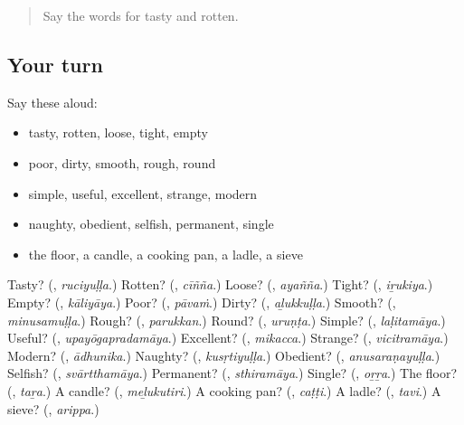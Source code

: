 \label{lesson:ML-R207-second-pass-words-from-chapters-203-207}



\begin{quote}
Say the words for tasty and rotten.
\end{quote}

\subsection*{Your turn}
Say these aloud:

\begin{itemize}
\raggedright
  \item tasty, rotten, loose, tight, empty
  \item poor, dirty, smooth, rough, round
  \item simple, useful, excellent, strange, modern
  \item naughty, obedient, selfish, permanent, single
  \item the floor, a candle, a cooking pan, a ladle, a sieve
\end{itemize}

\begin{tcolorbox}[breakable,colback=teal!4,colframe=teal!35!black,title={Before you move on}]
Tasty? (\textbf{}, \emph{ruciyuḷḷa}.) Rotten? (\textbf{}, \emph{cīñña}.) Loose? (\textbf{}, \emph{ayañña}.) Tight? (\textbf{}, \emph{iṟukiya}.) Empty? (\textbf{}, \emph{kāliyāya}.) Poor? (\textbf{}, \emph{pāvaṁ}.) Dirty? (\textbf{}, \emph{aḻukkuḷḷa}.) Smooth? (\textbf{}, \emph{minusamuḷḷa}.) Rough? (\textbf{}, \emph{parukkan}.) Round? (\textbf{}, \emph{uruṇṭa}.) Simple? (\textbf{}, \emph{laḷitamāya}.) Useful? (\textbf{}, \emph{upayōgapradamāya}.) Excellent? (\textbf{}, \emph{mikacca}.) Strange? (\textbf{}, \emph{vicitramāya}.) Modern? (\textbf{}, \emph{ādhunika}.) Naughty? (\textbf{}, \emph{kusṛtiyuḷḷa}.) Obedient? (\textbf{}, \emph{anusaraṇayuḷḷa}.) Selfish? (\textbf{}, \emph{svārtthamāya}.) Permanent? (\textbf{}, \emph{sthiramāya}.) Single? (\textbf{}, \emph{oṟṟa}.) The floor? (\textbf{}, \emph{taṟa}.) A candle? (\textbf{}, \emph{meḻukutiri}.) A cooking pan? (\textbf{}, \emph{caṭṭi}.) A ladle? (\textbf{}, \emph{tavi}.) A sieve? (\textbf{}, \emph{arippa}.)
\end{tcolorbox}
